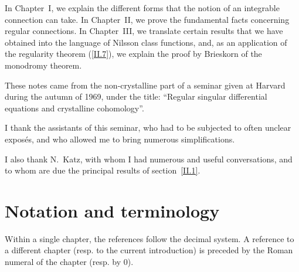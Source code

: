 \documentclass{report}
\theoremstyle{plain}
\theoremstyle{definition}
\newcommand{\oldpage}[1]{\marginpar{\footnotesize$\Big\vert$ \textit{p.~#1}}}
\begin{document}
In Chapter~I, we explain the different forms that the notion of an integrable connection can take.
In Chapter~II, we prove the fundamental facts concerning regular connections.
In Chapter~III, we translate certain results that we have obtained into the language of Nilsson class functions, and, as an application of the regularity theorem (\cref{II.7}), we explain the proof by Brieskorn \cite{5} of the monodromy theorem.

These notes came from the non-crystalline part of a seminar given at Harvard during the autumn of 1969, under the title: ``Regular singular differential equations and crystalline cohomology''.

I thank the assistants of this seminar, who had to be subjected to often unclear expos\'{e}s, and who allowed me to bring numerous simplifications.

I also thank N.~Katz, with whom I had numerous and useful conversations, and to whom are due the principal results of section~\cref{II.1}.


\section*{Notation and terminology}

\oldpage{2}
Within a single chapter, the references follow the decimal system.
A reference to a different chapter (resp. to the current introduction) is preceded by the Roman numeral of the chapter (resp. by 0).
\end{document}
